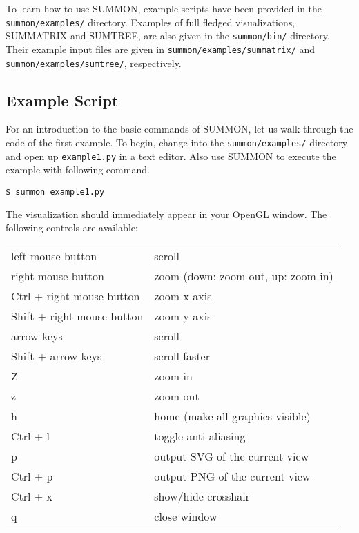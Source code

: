 \documentclass[12pt]{article}
\newcommand{\code}[1]{{\tt #1}}
\newcommand{\codeblock}[1]{\vspace{.1in} {\tt #1} \vspace{.1in}}
\begin{document}
To learn how to use SUMMON, example scripts have been provided in the 
\code{summon/examples/} directory.  Examples of full fledged
visualizations, SUMMATRIX and SUMTREE, are also given in the \code{summon/bin/}
directory.  Their example input files are given in
\code{summon/examples/summatrix/} and \code{summon/examples/sumtree/},
respectively.



\subsection{Example Script}

For an introduction to the basic commands of SUMMON, let us walk through the
code of the first example.  To begin, change into the
\code{summon/examples/} directory and open up \code{example1.py} in a
text editor.  Also use SUMMON to execute the example with following command.

\codeblock{\$ summon example1.py}

The visualization should immediately appear in your OpenGL window.  The
following controls are available:

\vspace{.1in}
\begin{tabular}{ll}
    left mouse button          & scroll \\
    right mouse button         & zoom (down: zoom-out, up: zoom-in)\\
    Ctrl + right mouse button  & zoom x-axis \\
    Shift + right mouse button & zoom y-axis \\
    arrow keys                 & scroll \\
    Shift + arrow keys         & scroll faster \\
    Z                          & zoom in \\
    z                          & zoom out \\
    h                          & home (make all graphics visible) \\
    Ctrl + l                   & toggle anti-aliasing \\
    p                          & output SVG of the current view \\
    Ctrl + p                   & output PNG of the current view \\
    Ctrl + x                   & show/hide crosshair \\
    q                          & close window \\
\end{tabular}
\vspace{.2in}
\end{document}
